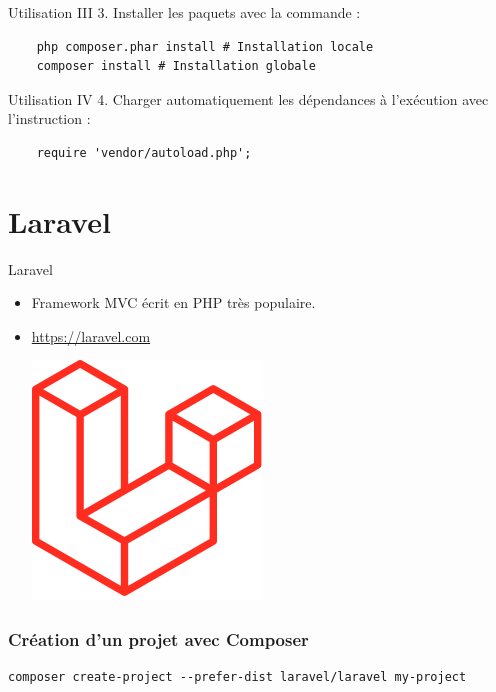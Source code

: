 \documentclass{beamer}
\begin{document}
\begin{frame}[fragile]{Utilisation III}
  3. Installer les paquets avec la commande :
  \begin{Verbatim}
    php composer.phar install # Installation locale
    composer install # Installation globale
  \end{Verbatim}
\end{frame}

\begin{frame}[fragile]{Utilisation IV}
  4. Charger automatiquement les dépendances à l'exécution avec l'instruction :
  \begin{verbatim}
    require 'vendor/autoload.php';
  \end{verbatim}
\end{frame}

\section{Laravel}
\begin{frame}{Laravel}
\begin{itemize}
  \item Framework MVC écrit en PHP très populaire.
  \item \url{https://laravel.com}
    \vspace{10pt}
    \begin{center}
      \includegraphics[scale=0.3]{images/laravel.png}
    \end{center}
\end{itemize}
\end{frame}

\begin{frame}[fragile]
\frametitle{Création d'un projet avec Composer}
\begin{Verbatim}[fontsize=\scriptsize]
  composer create-project --prefer-dist laravel/laravel my-project
\end{Verbatim}
\end{frame}
\end{document}
